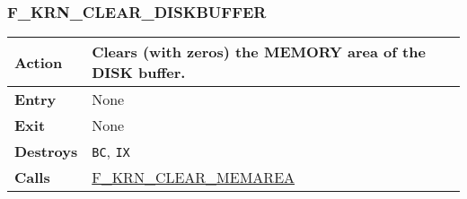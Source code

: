     \subsubsection{F\_KRN\_CLEAR\_DISKBUFFER}
    \label{func:fkrncleardiskbuffer}
    \begin{tabular}{l p{15cm}}
        \hline\textbf{Action}
        & Clears (with zeros) the \textbf{MEMORY} area of the \textbf{DISK}
        buffer.\\
        \hline\textbf{Entry} & None\\
        \hline\textbf{Exit} & None\\
        \hline\textbf{Destroys} & \texttt{BC}, \texttt{IX}\\
        \hline\textbf{Calls} & \hyperref[func:fkrnclearmemarea]{F\_KRN\_CLEAR\_MEMAREA}\\
        \hline
    \end{tabular}